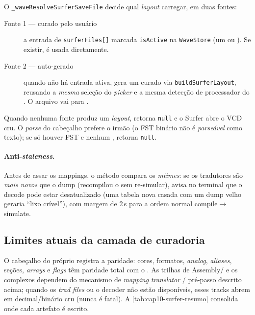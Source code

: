 O \lstinline|_waveResolveSurferSaveFile| decide qual \emph{layout} carregar, em duas
fontes:

\begin{description}
  \item[Fonte 1 — curado pelo usuário] a entrada de \lstinline|surferFiles[]|
        marcada \lstinline|isActive| na \lstinline|WaveStore| (um 
        ou ). Se existir, é usada diretamente.
  \item[Fonte 2 — auto-gerado] quando não há entrada ativa, gera um
         curado via \lstinline|buildSurferLayout|, reusando a
        \emph{mesma} seleção do \emph{picker} e a mesma detecção de processador do
        . O arquivo vai para
        .
\end{description}

Quando nenhuma fonte produz um \emph{layout}, retorna \lstinline|null| e o Surfer
abre o VCD cru. O \emph{parse} do cabeçalho prefere o irmão 
(o FST binário não é \emph{parseável} como texto); se só houver FST e nenhum
, retorna \lstinline|null|.

\paragraph{Anti-\emph{staleness}.} Antes de assar os mappings, o método compara os
\emph{mtimes}: se os tradutores são \emph{mais novos} que o dump (recompilou o
\cmm{} sem re-simular), avisa no terminal que o decode pode estar desatualizado
(uma tabela nova casada com um dump velho geraria \enquote{lixo crível}), com margem
de 2\,s para a ordem normal compile$\rightarrow$simulate.

\subsection{Limites atuais da camada de curadoria}
\label{sec:cap10-surfer-limites}

O cabeçalho do próprio  registra a paridade: cores,
formatos, \emph{analog}, \emph{aliases}, seções, \emph{arrays} e \emph{flags} têm
paridade total com o . As trilhas de Assembly/\cmm{} e os complexos
dependem do mecanismo de \emph{mapping translator} / pré-passo descrito acima; quando
os \emph{trad files} ou o decoder não estão disponíveis, esses tracks abrem em
decimal/binário cru (nunca é fatal). A \autoref{tab:cap10-surfer-resumo} consolida
onde cada artefato é escrito.

